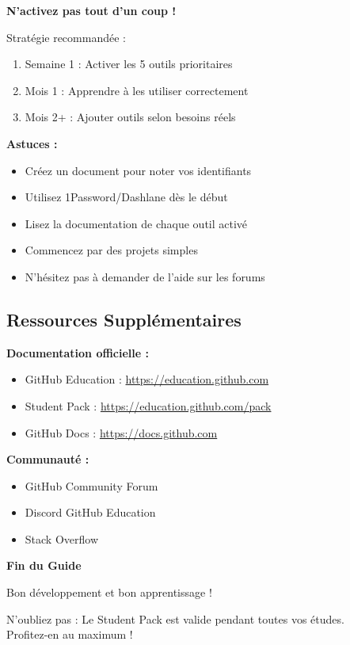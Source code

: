 \documentclass[11pt,a4paper]{article}
\begin{document}
\begin{important}
\textbf{N'activez pas tout d'un coup !}

Stratégie recommandée :
\begin{enumerate}
    \item Semaine 1 : Activer les 5 outils prioritaires
    \item Mois 1 : Apprendre à les utiliser correctement
    \item Mois 2+ : Ajouter outils selon besoins réels
\end{enumerate}
\end{important}

\begin{conseil}
\textbf{Astuces :}
\begin{itemize}
    \item Créez un document pour noter vos identifiants
    \item Utilisez 1Password/Dashlane dès le début
    \item Lisez la documentation de chaque outil activé
    \item Commencez par des projets simples
    \item N'hésitez pas à demander de l'aide sur les forums
\end{itemize}
\end{conseil}

\subsection{Ressources Supplémentaires}

\textbf{Documentation officielle :}
\begin{itemize}
    \item GitHub Education : \url{https://education.github.com}
    \item Student Pack : \url{https://education.github.com/pack}
    \item GitHub Docs : \url{https://docs.github.com}
\end{itemize}

\textbf{Communauté :}
\begin{itemize}
    \item GitHub Community Forum
    \item Discord GitHub Education
    \item Stack Overflow
\end{itemize}

\vspace{2cm}

\begin{center}
\textcolor{titrebleu}{\Large\textbf{Fin du Guide}}

\vspace{0.5cm}

\textcolor{defvert}{\large Bon développement et bon apprentissage !}

\vspace{1cm}

\textcolor{importantrouge}{\small N'oubliez pas : Le Student Pack est valide pendant toutes vos études.\\
Profitez-en au maximum !}
\end{center}
\end{document}
